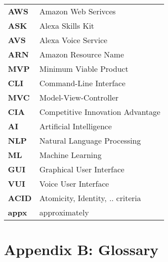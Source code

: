 \begin{flushleft}
\begin{tabular}{ll}
\textbf{AWS}	&	Amazon Web Serivces\\
\textbf{ASK}	&	Alexa Skills Kit\\
\textbf{AVS}	&	Alexa Voice Service\\
\textbf{ARN}	&	Amazon Resource Name\\
\textbf{MVP}	&	Minimum Viable Product\\
\textbf{CLI}	&	Command-Line Interface\\
\textbf{MVC}	&	Model-View-Controller\\
\textbf{CIA}	&	Competitive Innovation Advantage\\
\textbf{AI}		&	Artificial Intelligence\\
\textbf{NLP}	&	Natural Language Processing\\
\textbf{ML}		&	Machine Learning\\
\textbf{GUI}	&	Graphical User Interface\\
\textbf{VUI}	&	Voice User Interface\\
\textbf{ACID}	&	Atomicity, Identity, .. criteria\\

\textbf{appx}	&	approximately\\
\end{tabular}
\end{flushleft}

\newpage
\section*{Appendix B: Glossary}
%

